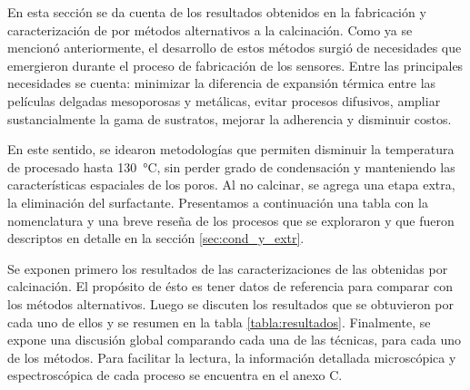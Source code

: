 	 En esta sección se da cuenta de los resultados obtenidos en la fabricación y caracterización de \pdm\space por métodos alternativos a la calcinación. Como ya se mencionó anteriormente, el desarrollo de estos métodos surgió de necesidades que emergieron durante el proceso de fabricación de los sensores. Entre las principales necesidades se cuenta: minimizar la diferencia de expansión térmica entre las películas delgadas mesoporosas y metálicas, evitar procesos difusivos, ampliar sustancialmente la gama de sustratos, mejorar la adherencia y disminuir costos.

	 En este sentido, se idearon metodologías que permiten disminuir la temperatura de procesado hasta \SI{130}{\celsius}, sin perder grado de condensación y manteniendo las características espaciales de los poros. Al no calcinar, se agrega una etapa extra, la eliminación del surfactante. Presentamos a continuación una tabla con la nomenclatura y una breve reseña de los procesos que se exploraron y que fueron descriptos en detalle en la sección \ref{sec:cond_y_extr}.

	 Se exponen primero los resultados de las caracterizaciones de las \pdm\space obtenidas por calcinación. El propósito de ésto es tener datos de referencia para comparar con los métodos alternativos. Luego se discuten los resultados que se obtuvieron por cada uno de ellos y se resumen en la tabla \ref{tabla:resultados}. Finalmente, se expone una discusión global comparando cada una de las técnicas, para cada uno de los métodos. Para facilitar la lectura, la información detallada microscópica y espectroscópica de cada proceso se encuentra en el anexo C.
	 
